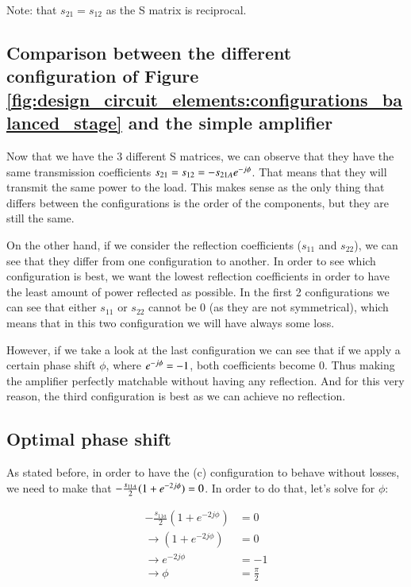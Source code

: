 \documentclass[12pt]{report} %
\begin{document}
Note: that $s_{21} = s_{12}$ as the S matrix is reciprocal.

\subsection{Comparison between the different configuration of Figure \ref{fig:design_circuit_elements:configurations_balanced_stage} and the simple amplifier}

Now that we have the 3 different S matrices, we can observe that they have the same transmission coefficients $s_{21} = s_{12} = - s_{21A} \* e^{- j \* \phi}$. That means that they will transmit the same power to the load. This makes sense as the only thing that differs between the configurations is the order of the components, but they are still the same.

On the other hand, if we consider the reflection coefficients ($s_{11}$ and $s_{22}$), we can see that they differ from one configuration to another. In order to see which configuration is best, we want the lowest reflection coefficients in order to have the least amount of power reflected as possible. In the first 2 configurations we can see that either $s_{11}$ or $s_{22}$ cannot be 0 (as they are not symmetrical), which means that in this two configuration we will have always some loss.

However, if we take a look at the last configuration we can see that if we apply a certain phase shift $\phi$, where $e^{- j \* \phi} = -1$, both coefficients become 0. Thus making the amplifier perfectly matchable without having any reflection. And for this very reason, the third configuration is best as we can achieve no reflection.

\subsection{Optimal phase shift}

As stated before, in order to have the (c) configuration to behave without losses, we need to make that $- \frac{s_{11A}}{2} \* (1 + e^{-2 \* j \* \phi}) = 0$. In order to do that, let's solve for $\phi$:

\begin{align*}
- \frac{s_{11a}}{2} (1 + e^{-2j\phi}) &= 0 \\
\rightarrow (1 + e^{-2j\phi}) &= 0 \\
\rightarrow e^{-2j\phi} &= -1 \\
\rightarrow \phi &= \frac{\pi}{2}
\end{align*}
\end{document}
